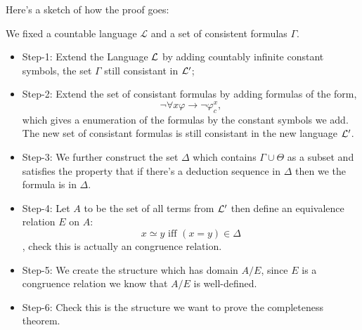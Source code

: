 \documentclass[11pt]{article}
\begin{document}
Here's a sketch of how the proof goes:

\begin{center}\end{center}

We fixed a countable language \(\mathcal{L}\) and a set of consistent formulas \(\Gamma\).
\begin{itemize}
\item Step-1: Extend the Language \(\mathcal{L}\) by adding countably infinite constant symbols, the set \(\Gamma\) still consistant in \(\mathcal{L}^{\prime}\);

\item Step-2: Extend the set of consistant formulas by adding formulas of the form,
\[
  \neg\forall x \varphi \to \neg \varphi  ^{x}_{c},
  \]
which gives a enumeration of the formulas by the constant symbols we add. The new set of consistant formulas is still consistant in the new language \(\mathcal{L}^{\prime}\).

\item Step-3: We further construct the set \(\Delta\) which contains \(\Gamma \cup \Theta\) as a subset and satisfies the property that if there's a deduction sequence in \(\Delta\) then we the formula is in \(\Delta\).

\item Step-4: Let \(A\) to be the set of all terms from \(\mathcal{L} ^{\prime}\) then define an equivalence relation \(E\) on \(A\):
\[
  x \simeq y \text{ iff } (x = y) \in \Delta
  \],
check this is actually an congruence relation.

\item Step-5: We create the structure which has domain \(A/E\), since \(E\) is a congruence relation we know that \(A/E\) is well-defined.

\item Step-6: Check this is the structure we want to prove the completeness theorem.
\end{itemize}
\end{document}

